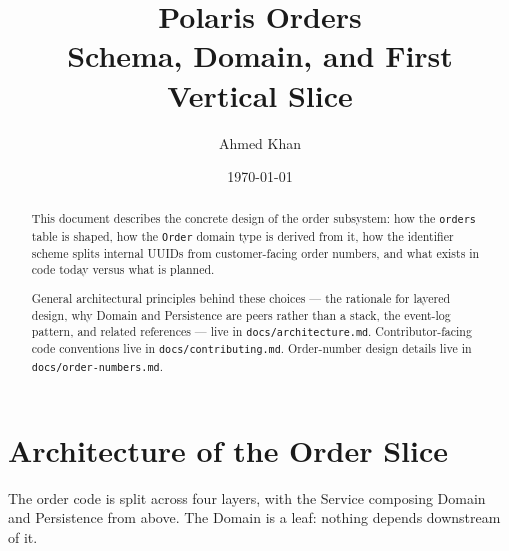 \documentclass[11pt]{article}
\title{\textbf{Polaris Orders}\\\large Schema, Domain, and First Vertical Slice}
\author{Ahmed Khan}
\date{\today}
\begin{document}
\maketitle

\begin{abstract}
\noindent This document describes the concrete design of the order subsystem: how the \texttt{orders} table is shaped, how the \texttt{Order} domain type is derived from it, how the identifier scheme splits internal UUIDs from customer-facing order numbers, and what exists in code today versus what is planned.

General architectural principles behind these choices --- the rationale for layered design, why Domain and Persistence are peers rather than a stack, the event-log pattern, and related references --- live in \texttt{docs/architecture.md}. Contributor-facing code conventions live in \texttt{docs/contributing.md}. Order-number design details live in \texttt{docs/order-numbers.md}.
\end{abstract}

\section{Architecture of the Order Slice}

The order code is split across four layers, with the Service composing Domain and Persistence from above. The Domain is a leaf: nothing depends downstream of it.
\end{document}
